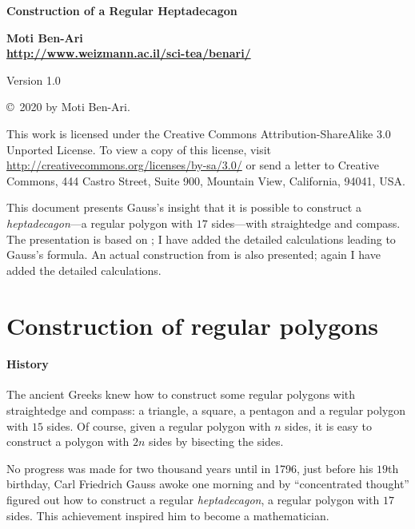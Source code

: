 \documentclass[11pt,a4paper]{article}
\begin{document}
\thispagestyle{empty}
\begin{center}
\textbf{\LARGE Construction of a Regular Heptadecagon}

\bigskip

\textbf{\Large Moti Ben-Ari\\\bigskip\url{http://www.weizmann.ac.il/sci-tea/benari/}}

\smallskip

Version 1.0

\medskip
\end{center}


\begin{footnotesize}
\begin{center}
\copyright{}\  2020 by Moti Ben-Ari. 
\end{center}
This work is licensed under the Creative Commons Attribution-ShareAlike 3.0 Unported License. To view a copy of this license, visit \url{http://creativecommons.org/licenses/by-sa/3.0/} or send a letter to Creative Commons, 444 Castro Street, Suite 900, Mountain View, California, 94041, USA.

\end{footnotesize}

This document presents Gauss's insight that it is possible to construct a \emph{heptadecagon}---a regular polygon with $17$ sides---with straightedge and compass. The presentation is based on \cite{jorg}; I have added the detailed calculations leading to Gauss's formula. An actual construction from \cite{callagy} is also presented; again I have added the detailed calculations.

\section{Construction of regular polygons}

\paragraph{History}
The ancient Greeks knew how to construct some regular polygons with straightedge and compass: a triangle, a square, a pentagon and a regular polygon with $15$ sides. Of course, given a regular polygon with $n$ sides, it is easy to construct a polygon with $2n$ sides by bisecting the sides.

No progress was made for two thousand years until in 1796, just before his $19$th birthday, Carl Friedrich Gauss awoke one morning and by ``concentrated thought'' figured out how to construct a regular \emph{heptadecagon}, a regular polygon with $17$ sides. This achievement inspired him to become a mathematician.
\end{document}
